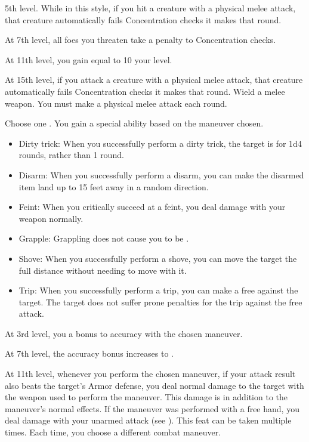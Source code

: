     \featpre 5th level.
    \featben While in this style, if you hit a creature with a physical melee attack, that creature automatically fails Concentration checks it makes that round.

    At 7th level, all foes you threaten take a  penalty to Concentration checks.

    At 11th level, you gain  equal to 10 \add your level.

    At 15th level, if you attack a creature with a physical melee attack, that creature automatically fails Concentration checks it makes that round.
    \stylereq Wield a melee weapon. You must make a physical melee attack each round.

    Choose one .
    \featben You gain a special ability based on the maneuver chosen.
    \begin{itemize}
        \item Dirty trick: When you successfully perform a dirty trick, the target is \impaired for 1d4 rounds, rather than 1 round.
        \item Disarm: When you successfully perform a disarm, you can make the disarmed item land up to 15 feet away in a random direction.
        \item Feint: When you critically succeed at a feint, you deal damage with your weapon normally.
        \item Grapple: Grappling does not cause you to be .
        \item Shove: When you successfully perform a shove, you can move the target the full distance without needing to move with it.
        \item Trip: When you successfully perform a trip, you can make a free  against the target. The target does not suffer prone penalties for the trip against the free attack.
    \end{itemize}

    At 3rd level, you a  bonus to accuracy with the chosen maneuver.

    At 7th level, the accuracy bonus increases to .

    At 11th level, whenever you perform the chosen maneuver, if your attack result also beats the target's Armor defense, you deal normal damage to the target with the weapon used to perform the maneuver.
    This damage is in addition to the maneuver's normal effects.
    If the maneuver was performed with a free hand, you deal damage with your unarmed attack (see ).
     This feat can be taken multiple times.
    Each time, you choose a different combat maneuver.

